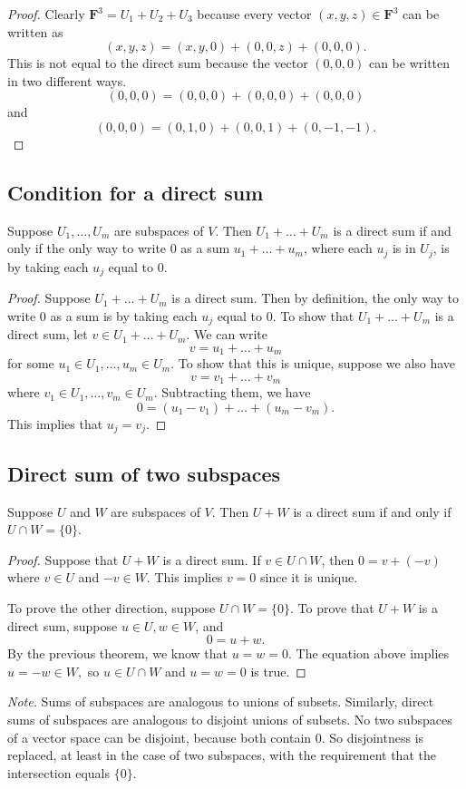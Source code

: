 \documentclass[11pt]{article}
\begin{document}
    \begin{proof}
        Clearly \(\textbf{F}^3 = U_1 + U_2 + U_3\) because every vector \((x,y,z)\in \textbf{F}^3\) can be written as \[(x,y,z) = (x,y,0) + (0,0,z) + (0,0,0).\] This is not equal to the direct sum because the vector \((0,0,0)\) can be written in two different ways. \[(0,0,0) = (0,0,0) + (0,0,0) + (0,0,0)\] and \[(0,0,0) = (0,1,0) + (0,0,1) + (0,-1,-1).\]
    \end{proof}

    \subsection{Condition for a direct sum}
    
    Suppose \(U_1, \dots, U_m\) are subspaces of $V$. Then \(U_1 + \dots + U_m\) is a direct sum if and only if the only way to write 0 as a sum \(u_1 + \dots + u_m\), where each \(u_j\) is in \(U_j\), is by taking each \(u_j\) equal to 0.

    \begin{proof}
        Suppose \(U_1 + \dots + U_m\) is a direct sum. Then by definition, the only way to write 0 as a sum is by taking each \(u_j\) equal to 0. To show that \(U_1 + \dots + U_m\) is a direct sum, let \(v \in U_1 + \dots + U_m.\) We can write \[v = u_1 + \dots + u_m\] for some \(u_1 \in U_1, \dots, u_m \in U_m.\) To show that this is unique, suppose we also have \[v = v_1 + \dots + v_m\] where \(v_1 \in U_1, \dots, v_m \in U_m\). Subtracting them, we have \[0 = (u_1 - v_1) + \dots + (u_m - v_m).\] This implies that \(u_j = v_j\). 
    \end{proof}

    \subsection{Direct sum of two subspaces}

    Suppose $U$ and $W$ are subspaces of $V$. Then $U+W$ is a direct sum if and only if \(U \cap W = \{0\}\).

    \begin{proof}
        Suppose that $U+W$ is a direct sum. If \(v \in U \cap W\), then \(0 = v + (-v)\) where \(v \in U\) and \(-v \in W\). This implies \(v = 0\) since it is unique. 

        To prove the other direction, suppose \(U \cap W = \{0\}\). To prove that \(U + W\) is a direct sum, suppose \(u \in U, w \in W\), and \[0 = u + w.\] By the previous theorem, we know that \(u = w = 0.\) The equation above implies \(u = -w \in W,\) so \(u \in U \cap W\) and \(u = w = 0\) is true.
    \end{proof}

    \emph{Note.} Sums of subspaces are analogous to unions of subsets. Similarly, direct sums of subspaces are analogous to disjoint unions of subsets. No two subspaces of a vector space can be disjoint, because both contain 0. So disjointness is replaced, at least in the case of two subspaces, with the requirement that the intersection equals \(\{0\}\).


    
\end{document}
